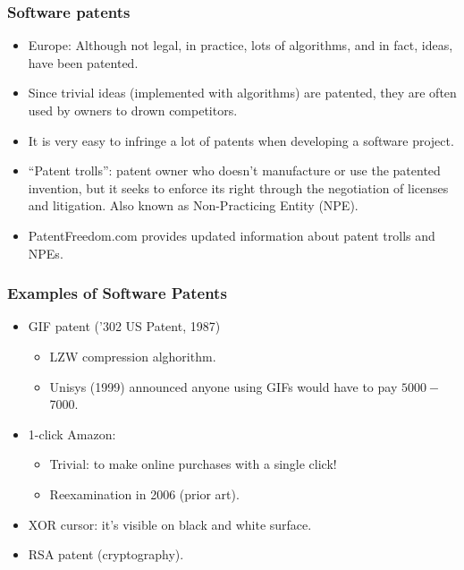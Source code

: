 \begin{frame}
\frametitle{Software patents}

\begin{itemize}
\item Europe: Although not legal, in
  practice, lots of algorithms, and in fact, ideas, have been
  patented.
\item Since trivial ideas (implemented with algorithms) are patented,
  they are often used by owners to drown competitors.
\item It is very easy to infringe a lot of patents when developing a software project.
\item ``\alert{Patent trolls}'': patent owner who doesn't manufacture or use the patented invention, but it seeks to enforce its right through the negotiation of licenses and litigation.
Also known as \alert{Non-Practicing Entity} (NPE).
\item PatentFreedom.com provides updated information about patent trolls and NPEs.
\end{itemize}

\end{frame}

\begin{frame}
\frametitle{Examples of Software Patents}

\begin{itemize}
\item GIF patent ('302 US Patent, 1987) 
	\begin{itemize}
	\item LZW compression alghorithm.
	\item Unisys (1999) announced anyone using GIFs would have to pay $5000-$7000.
	\end{itemize} 
\item 1-click Amazon: 
	\begin{itemize}
	\item Trivial: to make online purchases with a single click!
	\item Reexamination in 2006 (prior art).
	\end{itemize} 
\item XOR cursor: it's visible on black and white surface.
\item RSA patent (cryptography).
\end{itemize}                                                 

\end{frame}

